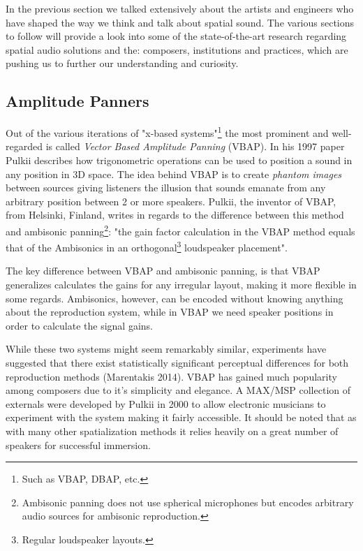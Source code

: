 In the previous section we talked extensively about the artists and engineers who have shaped the way we think and talk about spatial sound. The various sections to follow will provide a look into some of the state-of-the-art research regarding spatial audio solutions and the: composers, institutions and practices, which are pushing us to further our understanding and curiosity. 

\subsection{Amplitude Panners}
\label{subsec:amplitude panner}


Out of the various iterations of "x-based systems"\footnote{Such as VBAP, DBAP, etc.} the most prominent and well-regarded is called \textit{Vector Based Amplitude Panning} (VBAP). In his 1997 paper \cite{pulkki1997virtual} Pulkii describes how trigonometric operations can be used to position a sound in any position in 3D space. The idea behind VBAP is to create \textit{phantom images} between sources giving listeners the illusion that sounds emanate from any arbitrary position between 2 or more speakers. Pulkii, the inventor of VBAP, from Helsinki, Finland, writes in regards to the difference between this method and ambisonic panning\footnote{Ambisonic panning does not use spherical microphones but encodes arbitrary audio sources for ambisonic reproduction.}: "the gain factor calculation in the VBAP method equals that of the Ambisonics in an orthogonal\footnote{Regular loudspeaker layouts.} loudspeaker placement". 

The key difference between VBAP and ambisonic panning, is that VBAP generalizes calculates the gains for any irregular layout, making it more flexible in some regards. Ambisonics, however, can be encoded without knowing anything about the reproduction system, while in VBAP we need speaker positions in order to calculate the signal gains. 

While these two systems might seem remarkably similar, experiments have suggested that there exist statistically significant perceptual differences for both reproduction methods (Marentakis 2014). VBAP has gained much popularity among composers due to it's simplicity and elegance. A MAX/MSP collection of externals were developed by Pulkii in 2000 to allow electronic musicians to experiment with the system making it fairly accessible. It should be noted that as with many other spatialization methods it relies heavily on a great number of speakers for successful immersion. 

